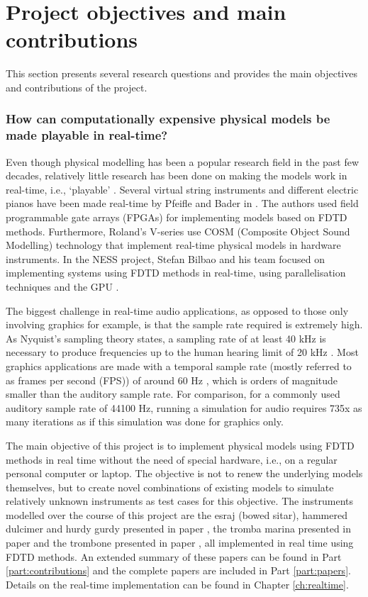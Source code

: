 \section{Project objectives and main contributions}\label{sec:objectivesContributions}
This section presents several research questions and provides the main objectives and contributions of the project. 

\subsubsection{How can computationally expensive physical models be made playable in real-time?}

Even though physical modelling has been a popular research field in the past few decades, relatively little research has been done on making the models work in real-time, i.e., `playable’ \cite{Mehes2016}. Several virtual string instruments and different electric pianos have been made real-time by Pfeifle and Bader in \cite{Pfeifle2012, Pfeifle2015, Pfeifle2017}. The authors used field programmable gate arrays (FPGAs) for implementing models based on FDTD methods. Furthermore, Roland’s V-series use COSM (Composite Object Sound Modelling) technology \cite{Bybee2019} that implement real-time physical models in hardware instruments. In the NESS project, Stefan Bilbao and his team focused on implementing systems using FDTD methods in real-time, using parallelisation techniques and the GPU \cite{Bilbao2019CMJa,Bilbao2019CMJb}. 


The biggest challenge in real-time audio applications, as opposed to those only involving graphics for example, is that the sample rate required is extremely high. As Nyquist's sampling theory states, a sampling rate of at least 40 kHz is necessary to produce frequencies up to the human hearing limit of 20 kHz \cite{Nyquist}. Most graphics applications are made with a temporal sample rate (mostly referred to as frames per second (FPS)) of around 60 Hz \cite{Yantis2016}, which is orders of magnitude smaller than the auditory sample rate. For comparison, for a commonly used auditory sample rate of 44100 Hz, running a simulation for audio requires 735x as many iterations as if this simulation was done for graphics only.  

The main objective of this project is to implement physical models using FDTD methods in real time without the need of special hardware, i.e., on a regular personal computer or laptop. The objective is not to renew the underlying models themselves, but to create novel combinations of existing models to simulate relatively unknown instruments as test cases for this objective. The instruments modelled over the course of this project are the esraj (bowed sitar), hammered dulcimer and hurdy gurdy presented in paper \citeP[A], the tromba marina presented in paper \citeP[D] and the trombone presented in paper \citeP[H], all implemented in real time using FDTD methods. An extended summary of these papers can be found in Part \ref{part:contributions} and the complete papers are included in Part \ref{part:papers}. Details on the real-time implementation can be found in Chapter \ref{ch:realtime}.

